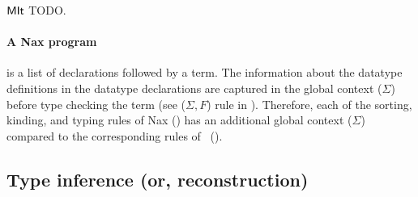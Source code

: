 $\mathsf{MIt}$ TODO.

\paragraph{A Nax program} is a list of declarations followed by a term.
The information about the datatype definitions
in the datatype declarations are captured in the global context ($\Sigma$)
before type checking the term (see ($\Sigma,F$) rule in ).
Therefore, each of the sorting, kinding, and typing rules of Nax
() has an additional global context ($\Sigma$) compared to
the corresponding rules of \Fi\ ().


\subsection{Type inference (or, reconstruction)}

